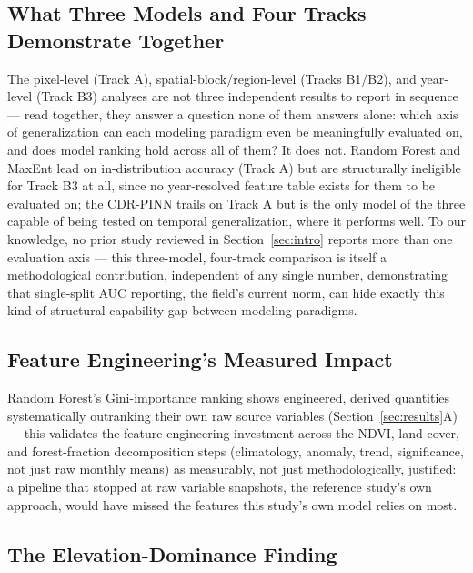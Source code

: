 \documentclass[journal]{IEEEtran}
\begin{document}
\subsection{What Three Models and Four Tracks Demonstrate Together}

The pixel-level (Track A), spatial-block/region-level (Tracks B1/B2), and year-level (Track B3) analyses are not three independent results to report in sequence --- read together, they answer a question none of them answers alone: which axis of generalization can each modeling paradigm even be meaningfully evaluated on, and does model ranking hold across all of them? It does not. Random Forest and MaxEnt lead on in-distribution accuracy (Track A) but are structurally ineligible for Track B3 at all, since no year-resolved feature table exists for them to be evaluated on; the CDR-PINN trails on Track A but is the only model of the three capable of being tested on temporal generalization, where it performs well. To our knowledge, no prior study reviewed in Section~\ref{sec:intro} reports more than one evaluation axis --- this three-model, four-track comparison is itself a methodological contribution, independent of any single number, demonstrating that single-split AUC reporting, the field's current norm, can hide exactly this kind of structural capability gap between modeling paradigms.

\subsection{Feature Engineering's Measured Impact}

Random Forest's Gini-importance ranking shows engineered, derived quantities systematically outranking their own raw source variables (Section~\ref{sec:results}A) --- this validates the feature-engineering investment across the NDVI, land-cover, and forest-fraction decomposition steps (climatology, anomaly, trend, significance, not just raw monthly means) as measurably, not just methodologically, justified: a pipeline that stopped at raw variable snapshots, the reference study's own approach, would have missed the features this study's own model relies on most.

\subsection{The Elevation-Dominance Finding}
\label{sec:jackknife_disc}
\end{document}
